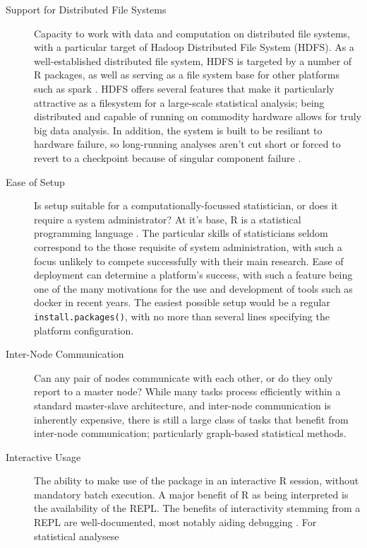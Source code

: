 \begin{description}
  \item[Support for Distributed File Systems]
    Capacity to work with data and computation on distributed file systems,
    with a particular target of Hadoop Distributed File System (HDFS). As a
    well-established distributed file system, HDFS is targeted by a number
    of R packages, as well as serving as a file system base for other
    platforms such as spark \cite{analytics:_rhadoop_wiki}
    \cite{deltarho:_rhipe}\cite{urbanek20}\cite{zaharia2016apache}. HDFS offers
    several features that make it particularly attractive as a filesystem
    for a large-scale statistical analysis; being distributed and capable of
    running on commodity hardware allows for truly big data analysis. In
    addition, the system is built to be resiliant to hardware failure, so
    long-running analyses aren't cut short or forced to revert to a
    checkpoint because of singular component failure
    \cite{shvachko2010hadoop}.
  \item[Ease of Setup]
    Is setup suitable for a computationally-focussed statistician, or does
    it require a system administrator? At it's base, R is a statistical
    programming language \cite{rcore2020intro}. The particular skills of
    statisticians seldom correspond to the those requisite of system
    administration, with such a focus unlikely to compete successfully with
    their main research. Ease of deployment can determine a platform's
    success, with such a feature being one of the many motivations for the
    use and development of tools such as docker in recent years. The easiest
    possible setup would be a regular
    \texttt{install.packages()}, with no more than
    several lines specifying the platform configuration.
  \item[Inter-Node Communication]
    Can any pair of nodes communicate with each other, or do they only
    report to a master node? While many tasks process efficiently within a
    standard master-slave architecture, and inter-node communication is
    inherently expensive, there is still a large class of tasks that benefit
    from inter-node communication\cite{walker1996mpi}; particularly
    graph-based statistical methods.
  \item[Interactive Usage]
    The ability to make use of the package in an interactive R session,
    without mandatory batch execution. A major benefit of R as being
    interpreted is the availability of the REPL. The benefits of
    interactivity stemming from a REPL are well-documented, most notably
    aiding debugging \cite{mccarthy1978history}. For statistical analysese

\end{description}
